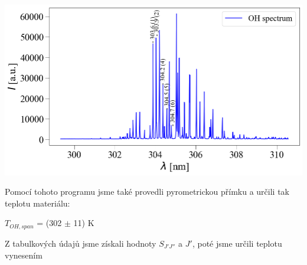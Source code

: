 \documentclass[a4paper,11pt]{article}
\begin{document}
\begin{minipage}[t]{0.5\textwidth}
                \vspace{10pt}   
                \par \centering
                \includegraphics[scale=0.33]{OH_spec}
                \captionsetup{justification=centering, font=footnotesize}
                \label{fig:OH_spec}
                \vspace{10pt}
                \raggedright  

                \par Pomocí tohoto programu jsme také provedli pyrometrickou přímku a určili tak teplotu materiálu: 
                \begin{center}
                    $T_{OH, span}$ = (302 $\pm$ 11) K
                \end{center}

                Z tabulkových údajů jsme získali hodnoty $S_{J'J''}$ a $J'$, poté jsme určili teplotu vynesením
    \end{minipage}
    \hspace{10pt}
\end{document}
